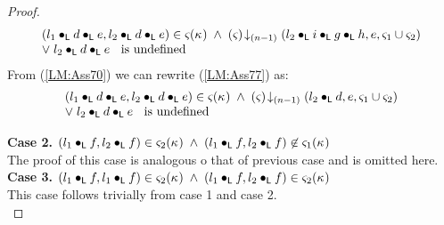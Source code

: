 \begin{lemma}[]
\begin{proof}
%
\begin{align}
	\begin{array}{l}
		(l_1 \bullet_{\textsf{L}} d \bullet_{\textsf{L}} e, l_2 \bullet_{\textsf{L}} d \bullet_{\textsf{L}} e) \in \varsigma_{}(\kappa_{}) \;\land\;\left(\varsigma_{}\right) \!\downarrow_{(n-1)} \left(l_2 \bullet_{\textsf{L}} i \bullet_{\textsf{L}} g \bullet_{\textsf{L}} h, e, \varsigma_{1} \cup \varsigma_{2}\right) \\
		\lor\; l_2 \bullet_{\textsf{L}} d \bullet_{\textsf{L}} e \hspace*{0.2cm}\text{ is undefined}
	\end{array} \label{LM:Ass77}
\end{align}
From (\ref{LM:Ass70}) we can rewrite (\ref{LM:Ass77}) as:
%
\begin{align}
	\begin{array}{l}
		(l_1 \bullet_{\textsf{L}} d \bullet_{\textsf{L}} e, l_2 \bullet_{\textsf{L}} d \bullet_{\textsf{L}} e) \in \varsigma_{}(\kappa_{}) \;\land\;\left(\varsigma_{}\right) \!\downarrow_{(n-1)} \left(l_2 \bullet_{\textsf{L}} d, e, \varsigma_{1} \cup \varsigma_{2}\right) \\
		\lor\; l_2 \bullet_{\textsf{L}} d \bullet_{\textsf{L}} e \hspace*{0.2cm}\text{ is undefined}
	\end{array}
	 \label{LM:Case3.1.2}
\end{align}

%
%
%
%
%

\noindent\textbf{Case 2.} $(l_1 \bullet_{\textsf{L}} f, l_2 \bullet_{\textsf{L}} f) \in \varsigma_{2}(\kappa_{}) \;\land\; (l_1 \bullet_{\textsf{L}} f, l_2 \bullet_{\textsf{L}} f) \not\in \varsigma_{1}(\kappa_{})$\\
The proof of this case is analogous o that of previous case and is omitted here.\\

\noindent\textbf{Case 3.} $(l_1 \bullet_{\textsf{L}} f, l_1 \bullet_{\textsf{L}} f) \in \varsigma_{2}(\kappa_{}) \;\land\; (l_1 \bullet_{\textsf{L}} f, l_2 \bullet_{\textsf{L}} f) \in \varsigma_{2}(\kappa_{})$\\
This case follows trivially from case 1 and case 2. \\


\end{proof}
\end{lemma}
%
%